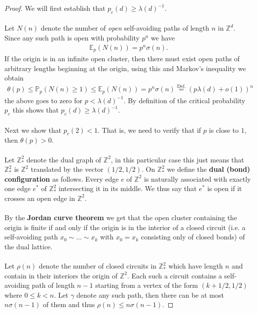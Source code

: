 \documentclass[12pt,a4paper]{article}
\theoremstyle{definition}
\begin{document}
\begin{proof}
We will first establish that $p_c(d) \geq \lambda(d)^{-1}$. \\\\
Let $N(n)$ denote the number of \textit{open} self-avoiding paths of length $n$ in $\mathbb{Z}^d$. Since any such path is open with probability $p^n$ we have 
\begin{align*}
\mathbb{E}_p(N(n))=p^n \sigma(n). 
\end{align*}
If the origin is in an infinite open cluster, then there must exist open paths of arbitrary lengths beginning at the origin, using this and Markov's inequality we obtain 
\begin{align*}
\theta(p) \leq \mathbb{P}_p(N(n) \geq 1) \leq \mathbb{E}_p(N(n)) = p^n \sigma(n) \overset{\text{Def.}} = ( p  \lambda(d) + o(1))^n 
\end{align*}
the above goes to zero for $p < \lambda(d)^{-1}$. By definition of the critical probability $p_c$ this shows that $p_c(d) \geq \lambda(d)^{-1}$.
\\\\
Next we show that $p_c(2) < 1$. That is, we need to verify that if $p$ is close to $1$, then $\theta(p) >0$. 
\\\\
Let $\mathbb{Z}_*^2$ denote the dual graph of $\mathbb{Z}^2$, in this particular case this just means that $\mathbb{Z}_*^2$ is $\mathbb{Z}^2$ translated by the vector $(1/2,1/2)$. On $\mathbb{Z}_*^2$ we define the \textbf{dual (bond) configuration} as follows. Every edge $e$ of $\mathbb{Z}^2$ is naturally associated with exactly one edge $e^*$ of $\mathbb{Z}_*^2$ intersecting it in its middle. We thus say that $e^*$ is open if it crosses an open edge in $\mathbb{Z}^2$.  
\\\\
By the \textbf{Jordan curve theorem} we get that the open cluster containing the origin is finite if and only if the origin is in the interior of a closed circuit (i.e. a self-avoiding path $x_0 \sim \dots \sim x_k$ with $x_0=x_k$ consisting only of closed bonds) of the dual lattice.  
\\\\
Let $\rho(n)$ denote the number of closed circuits in $\mathbb{Z}_*^2$ which have length $n$ and contain in their interiors the origin of $\mathbb{Z}^2$. Each such a circuit contains a self-avoiding path of length $n-1$ starting from a vertex of the form $(k+1/2,1/2)$ where $0 \leq k <n$. Let $\gamma$ denote any such path, then there can be at most $n \sigma(n-1)$ of them and thus $\rho(n) \leq n \sigma(n-1)$. 

\end{proof}
\end{document}
